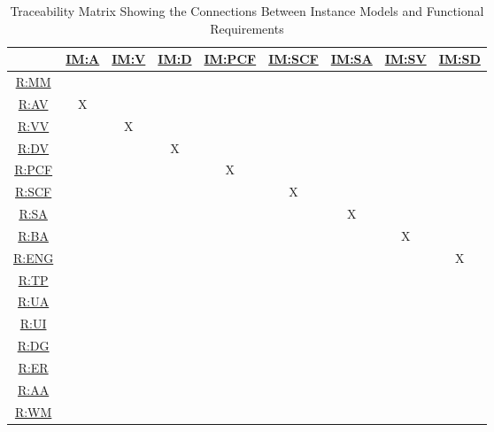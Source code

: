 \documentclass[12pt]{article}
\newcommand{\hpref}[1]{\hyperref[#1]{#1}}
\begin{document}
\begin{table}[h!]
\centering
\begin{tabular}{|c|c|c|c|c|c|c|c|c|}
\hline
	& \hpref{IM:A} & \hpref{IM:V}& \hpref{IM:D} & \hpref{IM:PCF} & \hpref{IM:SCF} & \hpref{IM:SA}& \hpref{IM:SV}& \hpref{IM:SD}\\
\hline

\hpref{R:MM}          & & & & & & & &  \\ \hline
\hpref{R:AV}          &X& & & & & & &  \\ \hline
\hpref{R:VV}          & &X& & & & & &  \\ \hline
\hpref{R:DV}          & & &X& & & & &  \\ \hline
\hpref{R:PCF}          & & & &X& & & &  \\ \hline
\hpref{R:SCF}          & & & & &X& & &  \\ \hline
\hpref{R:SA}          & & & & & &X& &  \\ \hline
\hpref{R:BA}          & & & & & & &X&  \\ \hline
\hpref{R:ENG}          & & & & & & & &X \\ \hline
\hpref{R:TP}         & & & & & & & &  \\ \hline
\hpref{R:UA}         & & & & & & & &  \\ \hline
\hpref{R:UI}         & & & & & & & &  \\ \hline
\hpref{R:DG}         & & & & & & & &  \\ \hline
\hpref{R:ER}         & & & & & & & &  \\ \hline
\hpref{R:AA}         & & & & & & & &  \\ \hline
\hpref{R:WM}         & & & & & & & &  \\ \hline
\end{tabular}
\caption{Traceability Matrix Showing the Connections Between Instance Models and Functional Requirements}
\label{Table:trace_requirements}
\end{table}
\end{document}
